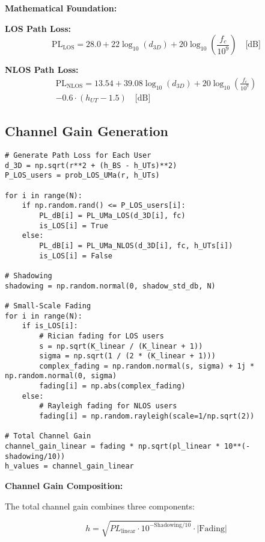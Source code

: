 \documentclass[11pt,a4paper]{article}
\begin{document}
\textbf{Mathematical Foundation:}

\textbf{LOS Path Loss:}
\begin{equation}
\text{PL}_{\text{LOS}} = 28.0 + 22 \log_{10}(d_{3D}) + 20 \log_{10}\left(\frac{f_c}{10^9}\right) \quad \text{[dB]}
\end{equation}

\textbf{NLOS Path Loss:}
\begin{multline}
\text{PL}_{\text{NLOS}} = 13.54 + 39.08 \log_{10}(d_{3D}) + 20 \log_{10}\left(\frac{f_c}{10^9}\right) \\
- 0.6 \cdot (h_{UT} - 1.5) \quad \text{[dB]}
\end{multline}

\subsection{Channel Gain Generation}

\begin{lstlisting}[caption={Complete Channel Gain Calculation}]
# Generate Path Loss for Each User
d_3D = np.sqrt(r**2 + (h_BS - h_UTs)**2)
P_LOS_users = prob_LOS_UMa(r, h_UTs)

for i in range(N):
    if np.random.rand() <= P_LOS_users[i]:
        PL_dB[i] = PL_UMa_LOS(d_3D[i], fc)
        is_LOS[i] = True
    else:
        PL_dB[i] = PL_UMa_NLOS(d_3D[i], fc, h_UTs[i])
        is_LOS[i] = False

# Shadowing
shadowing = np.random.normal(0, shadow_std_db, N)

# Small-Scale Fading
for i in range(N):
    if is_LOS[i]:
        # Rician fading for LOS users
        s = np.sqrt(K_linear / (K_linear + 1))
        sigma = np.sqrt(1 / (2 * (K_linear + 1)))
        complex_fading = np.random.normal(s, sigma) + 1j * np.random.normal(0, sigma)
        fading[i] = np.abs(complex_fading)
    else:
        # Rayleigh fading for NLOS users
        fading[i] = np.random.rayleigh(scale=1/np.sqrt(2))

# Total Channel Gain
channel_gain_linear = fading * np.sqrt(pl_linear * 10**(-shadowing/10))
h_values = channel_gain_linear
\end{lstlisting}

\textbf{Channel Gain Composition:}

The total channel gain combines three components:

\begin{equation}
h = \sqrt{PL_{\text{linear}} \cdot 10^{-\text{Shadowing}/10}} \cdot |\text{Fading}|
\end{equation}
\end{document}
